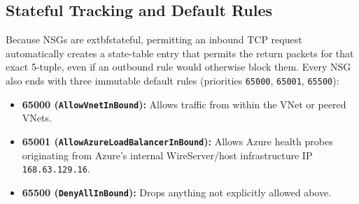 \subsection{Stateful Tracking and Default Rules}
Because NSGs are 	extbf{stateful}, permitting an inbound TCP request automatically creates a state-table entry that permits the return packets for that exact 5-tuple, even if an outbound rule would otherwise block them. Every NSG also ends with three immutable default rules (priorities \texttt{65000}, \texttt{65001}, \texttt{65500}):
\begin{itemize}[leftmargin=12pt]
  \item \textbf{65000 (\texttt{AllowVnetInBound}):} Allows traffic from within the VNet or peered VNets.
  \item \textbf{65001 (\texttt{AllowAzureLoadBalancerInBound}):} Allows Azure health probes originating from Azure's internal WireServer/host infrastructure IP \texttt{168.63.129.16}.
  \item \textbf{65500 (\texttt{DenyAllInBound}):} Drops anything not explicitly allowed above.
\end{itemize}

